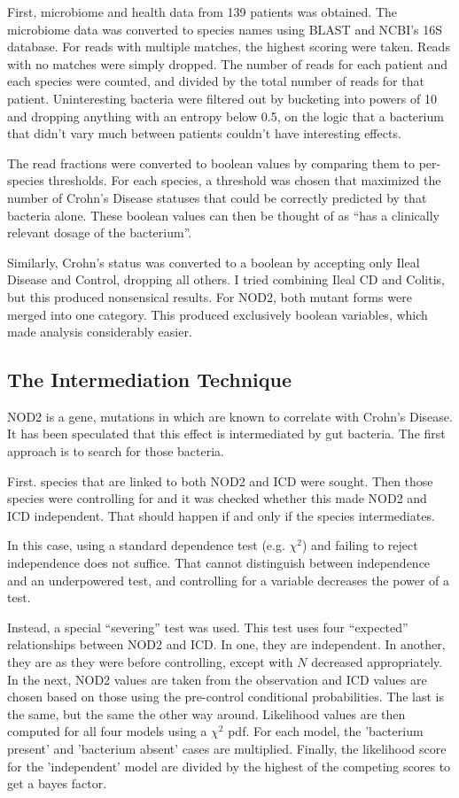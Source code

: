 \documentclass[a4paper]{article}
\begin{document}
First, microbiome and health data from 139 patients\cite{data} was
obtained. The microbiome data was
converted  to species names using BLAST and NCBI's
16S database.  For reads with multiple matches, the highest
scoring were taken.  Reads with no matches were simply dropped.  
The number of reads for each patient and each species were counted, and divided
by the total number of reads for that patient.  Uninteresting bacteria
were filtered out
by bucketing into powers of 10 and dropping
anything with an entropy below 0.5, on the logic that a bacterium that
didn't vary much between patients couldn't have interesting effects.

The read fractions were converted to boolean values by comparing them to
per-species thresholds.  For each species, a threshold was chosen that
maximized the number of Crohn's Disease statuses that could be
correctly predicted by that bacteria alone.  These boolean values can
then be thought of as ``has a clinically relevant dosage of the
bacterium''.

Similarly, Crohn's status was converted to a boolean by accepting only
Ileal Disease and Control, dropping all others.  I tried combining
Ileal CD and Colitis, but this produced nonsensical results.  For
NOD2, both mutant forms were merged into one category.  This produced exclusively
boolean variables, which made analysis considerably easier.

\subsection{The Intermediation Technique}

NOD2 is a gene, mutations in which are known\cite{data} to correlate with
Crohn's Disease.  It has been speculated that this effect is
intermediated by gut bacteria.  The first approach is to search for
those bacteria.

First. species that are linked to both NOD2 and ICD were sought.
Then  those species were controlling for and it was checked whether
this  made NOD2 and
ICD independent.  That should happen if and only if the species
intermediates.

In this case, using a standard dependence test (e.g. $\chi^2$) and
failing to reject independence does not suffice.  That cannot
distinguish between independence and an underpowered test, and
controlling for a variable decreases the power of a test.  

Instead, a special ``severing'' test was used.  This test uses four
``expected'' relationships between NOD2 and ICD.  In one, they are
independent.  In another, they are as they were before controlling,
except with $N$ decreased appropriately.  In the next, NOD2 values are
taken from the observation and ICD values are chosen based on those
using the pre-control conditional probabilities.  The last is the
same, but
the same the other way around.  Likelihood values are then computed for
all four models using a $\chi^2$ pdf.  For each model,  the
'bacterium present' and 'bacterium absent' cases are multiplied.  Finally, the
likelihood score for the 'independent' model are divided by the highest of the
competing scores to get a bayes factor.
\end{document}
